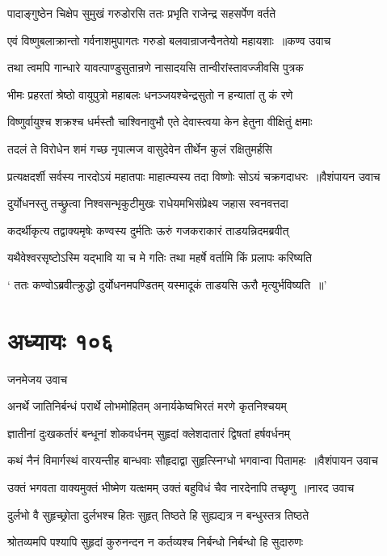 \twolineshloka
{पादाङ्गुष्ठेन चिक्षेप सुमुखं गरुडोरसि}
{ततः प्रभृति राजेन्द्र सहसर्पेण वर्तते}


\threelineshloka
{एवं विष्णुबलाक्रान्तो गर्वनाशमुपागतः}
{गरुडो बलवान्राजन्वैनतेयो महायशाः ॥कण्व उवाच}
{}


\twolineshloka
{तथा त्वमपि गान्धारे यावत्पाण्डुसुतान्रणे}
{नासादयसि तान्वीरांस्तावज्जीवसि पुत्रक}


\twolineshloka
{भीमः प्रहरतां श्रेष्ठो वायुपुत्रो महाबलः}
{धनञ्जयश्चेन्द्रसुतो न हन्यातां तु कं रणे}


\twolineshloka
{विष्णुर्वायुश्च शक्रश्च धर्मस्तौ चाश्विनावुभौ}
{एते देवास्त्वया केन हेतुना वीक्षितुं क्षमाः}


\twolineshloka
{तदलं ते विरोधेन शमं गच्छ नृपात्मज}
{वासुदेवेन तीर्थेन कुलं रक्षितुमर्हसि}


\threelineshloka
{प्रत्यक्षदर्शी सर्वस्य नारदोऽयं महातपाः}
{माहात्म्यस्य तदा विष्णोः सोऽयं चक्रगदाधरः ॥वैशंपायन उवाच}
{}


\twolineshloka
{दुर्योधनस्तु तच्छ्रुत्वा निश्वसन्भृकुटीमुखः}
{राधेयमभिसंप्रेक्ष्य जहास स्वनवत्तदा}


\twolineshloka
{कदर्थीकृत्य तद्वाक्यमृषेः कण्वस्य दुर्मतिः}
{ऊरुं गजकराकारं ताडयन्निदमब्रवीत्}


\twolineshloka
{यथैवेश्वरसृष्टोऽस्मि यद्भावि या च मे गतिः}
{तथा महर्षे वर्तामि किं प्रलापः करिष्यति}


\twolineshloka
{` ततः कण्वोऽब्रवीत्क्रुद्धो दुर्योधनमपण्डितम्}
{यस्मादूकं ताडयसि ऊरौ मृत्युर्भविष्यति ॥'}


\chapter{अध्यायः १०६}
\twolineshloka
{जनमेजय उवाच}
{}


\twolineshloka
{अनर्थे जातिनिर्बन्धं परार्थे लोभमोहितम्}
{अनार्यकेष्वभिरतं मरणे कृतनिश्चयम्}


\twolineshloka
{ज्ञातीनां दुःखकर्तारं बन्धूनां शोकवर्धनम्}
{सुहृदां क्लेशदातारं द्विषतां हर्षवर्धनम्}


\threelineshloka
{कथं नैनं विमार्गस्थं वारयन्तीह बान्धवाः}
{सौहृदाद्वा सुहृत्स्निग्धो भगवान्वा पितामहः ॥वैशंपायन उवाच}
{}


\threelineshloka
{उक्तं भगवता वाक्यमुक्तं भीष्मेण यत्क्षमम्}
{उक्तं बहुविधं चैव नारदेनापि तच्छृणु ॥नारद उवाच}
{}


\twolineshloka
{दुर्लभो वै सुहृच्छ्रोता दुर्लभश्च हितः सुहृत्}
{तिष्ठते हि सुह्यद्यत्र न बन्धुस्तत्र तिष्ठते}


\twolineshloka
{श्रोतव्यमपि पश्यापि सुहृदां कुरुनन्दन}
{न कर्तव्यश्च निर्बन्धो निर्बन्धो हि सुदारुणः}


